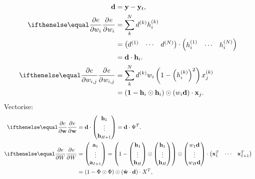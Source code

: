 \begin{align*}
    \mathbf{d}
    &= \mathbf{y} - \mathbf{y}_t,\\
    \Rpdiff{e}{w_i}
    &= \sum_{k}^{N} d^{(k)} h_i^{(k)}\\
    &= \begin{pmatrix}
        d^{(1)} & \cdots & d^{(N)}
    \end{pmatrix}
    \cdot
    \begin{pmatrix}
        h_i^{(1)} & \cdots & h_i^{(N)}
    \end{pmatrix}\\
    &= \mathbf{d}\cdot\mathbf{h}_i.
    \\
    \Rpdiff{e}{w_{i,j}}
    &= \sum_{k}^{N} d^{(k)}w_i\left(1-\left(h_i^{(k)}\right)^2\right)x_j^{(k)}\\
    &= (\mathbf{1} - \mathbf{h}_i\odot\mathbf{h}_i)\odot(w_i\mathbf{d})
    \cdot \mathbf{x}_j.\\
\end{align*}
Vectorise:
\begin{align*}
    \Rpdiff{e}{\mathbf{w}}
    &= \mathbf{d}\cdot
    \begin{pmatrix}
        \mathbf{h}_1 \\\vdots\\ \mathbf{h}_{H+1}
    \end{pmatrix}
    = \mathbf{d}\cdot\Psi^T.
    \\
    \Rpdiff{e}{W} &=
    \begin{pmatrix}
        \mathbf{a}_1 \\\vdots\\ \mathbf{a}_{I+1}
    \end{pmatrix}
    = \left(1 - \begin{pmatrix}
            \mathbf{h}_1 \\\vdots\\ \mathbf{h}_{H}
        \end{pmatrix}\odot\begin{pmatrix}
            \mathbf{h}_1 \\\vdots\\ \mathbf{h}_{H}
        \end{pmatrix}
    \right)
    \odot
    \begin{pmatrix}
        w_1\mathbf{d} \\\vdots\\ w_{H}\mathbf{d}
    \end{pmatrix}
    \cdot
    \begin{pmatrix}
        \mathbf{x}_1^T & \cdots & \mathbf{x}_{I+1}^T
    \end{pmatrix}\\
    &=
    (1 - \Phi\odot\Phi)\odot(\hat{\mathbf{w}}\cdot\mathbf{d})
    \cdot X^T,\\
\end{align*}
